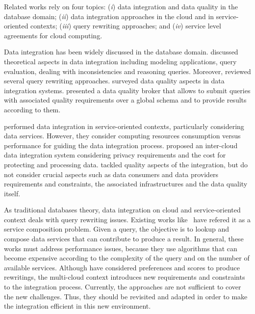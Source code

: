 Related works rely on four topics: 
(\textit{i}) data integration and data quality in the database domain;
(\textit{ii}) data integration approaches in the cloud and in service-oriented contexts; 
(\textit{iii}) query rewriting approaches; and 
(\textit{iv}) service level agreements for cloud computing.

Data integration has been widely discussed in the database domain.
\cite{Lenzerini:2002} discussed theoretical aspects in data integration including modeling applications, query evaluation, dealing with inconsistencies and reasoning queries.
Moreover, \cite{Halevy:2001} reviewed several query rewriting approaches. 
\cite{Batini2006} surveyed data quality aspects in data integration systems. 
\cite{Scannapieco:2004} presented a data quality broker that allows to submit queries with associated quality requirements over a global schema and to provide results according to them.

\cite{Correndo2010,ElSheikh2013} performed data integration in service-oriented contexts, particularly considering data services. However, they  consider computing resources consumption versus performance for guiding the data integration process. 
\cite{Tian2010} proposed an inter-cloud data integration system considering privacy requirements and the cost for protecting and processing data. 
\cite{Scannapieco:2004,Tian2010,YauY08} tackled quality aspects of the integration, but do not consider crucial aspects such as data consumers and data providers requirements and constraints, the associated infrastructures and the data quality itself. %

As traditional databases theory, data integration on cloud and service-oriented context deals with query rewriting issues. Existing works like~\cite{ba2014,Barhamgi2010,Benouaret2011,Umberto} have refered it as a service composition problem. Given a query, the objective is to lookup and compose data services that can contribute to produce a result. In general, these works must address performance issues, because they use algorithms that can become expensive according to the complexity of the query and on the number of available services. Although \cite{ba2014,Benouaret2011} have considered preferences and scores to produce rewritings, the multi-cloud context introduces new requirements and constraints to the integration process. Currently, the approaches are not sufficient to cover the new challenges. Thus, they should be revisited and adapted in order to make the integration efficient in this new environment. 

